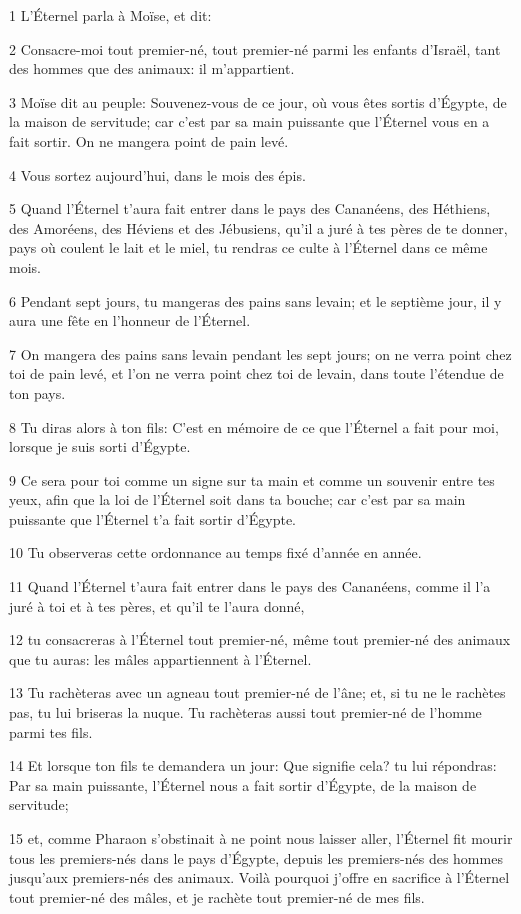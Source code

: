 \par 1 L'Éternel parla à Moïse, et dit:
\par 2 Consacre-moi tout premier-né, tout premier-né parmi les enfants d'Israël, tant des hommes que des animaux: il m'appartient.
\par 3 Moïse dit au peuple: Souvenez-vous de ce jour, où vous êtes sortis d'Égypte, de la maison de servitude; car c'est par sa main puissante que l'Éternel vous en a fait sortir. On ne mangera point de pain levé.
\par 4 Vous sortez aujourd'hui, dans le mois des épis.
\par 5 Quand l'Éternel t'aura fait entrer dans le pays des Cananéens, des Héthiens, des Amoréens, des Héviens et des Jébusiens, qu'il a juré à tes pères de te donner, pays où coulent le lait et le miel, tu rendras ce culte à l'Éternel dans ce même mois.
\par 6 Pendant sept jours, tu mangeras des pains sans levain; et le septième jour, il y aura une fête en l'honneur de l'Éternel.
\par 7 On mangera des pains sans levain pendant les sept jours; on ne verra point chez toi de pain levé, et l'on ne verra point chez toi de levain, dans toute l'étendue de ton pays.
\par 8 Tu diras alors à ton fils: C'est en mémoire de ce que l'Éternel a fait pour moi, lorsque je suis sorti d'Égypte.
\par 9 Ce sera pour toi comme un signe sur ta main et comme un souvenir entre tes yeux, afin que la loi de l'Éternel soit dans ta bouche; car c'est par sa main puissante que l'Éternel t'a fait sortir d'Égypte.
\par 10 Tu observeras cette ordonnance au temps fixé d'année en année.
\par 11 Quand l'Éternel t'aura fait entrer dans le pays des Cananéens, comme il l'a juré à toi et à tes pères, et qu'il te l'aura donné,
\par 12 tu consacreras à l'Éternel tout premier-né, même tout premier-né des animaux que tu auras: les mâles appartiennent à l'Éternel.
\par 13 Tu rachèteras avec un agneau tout premier-né de l'âne; et, si tu ne le rachètes pas, tu lui briseras la nuque. Tu rachèteras aussi tout premier-né de l'homme parmi tes fils.
\par 14 Et lorsque ton fils te demandera un jour: Que signifie cela? tu lui répondras: Par sa main puissante, l'Éternel nous a fait sortir d'Égypte, de la maison de servitude;
\par 15 et, comme Pharaon s'obstinait à ne point nous laisser aller, l'Éternel fit mourir tous les premiers-nés dans le pays d'Égypte, depuis les premiers-nés des hommes jusqu'aux premiers-nés des animaux. Voilà pourquoi j'offre en sacrifice à l'Éternel tout premier-né des mâles, et je rachète tout premier-né de mes fils.
